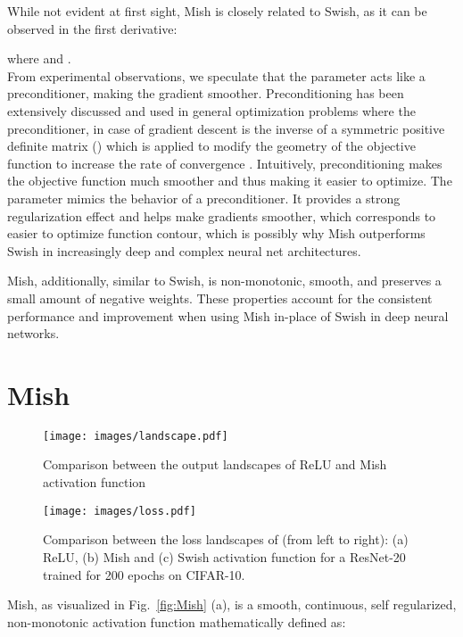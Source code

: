 \documentclass{bmvc2k}
\begin{document}
 
While not evident at first sight, Mish is closely related to Swish, as it can be observed in the first derivative:


where   and  . 
\\

From experimental observations, we speculate that the  parameter acts like a preconditioner, making the gradient smoother. Preconditioning has been extensively discussed and used in general optimization problems where the preconditioner, in case of gradient descent \cite{bottou2010large, li2017preconditioned} is the inverse of a symmetric positive definite matrix () which is applied to modify the geometry of the objective function to increase the rate of convergence \cite{axelsson1986rate}. Intuitively, preconditioning makes the objective function much smoother and thus making it easier to optimize. The  parameter mimics the behavior of a preconditioner. It provides a strong regularization effect and helps make gradients smoother, which corresponds to easier to optimize function contour, which is possibly why Mish outperforms Swish in increasingly deep and complex neural net architectures. 

Mish, additionally, similar to Swish, is non-monotonic, smooth, and preserves a small amount of negative weights. These properties account for the consistent performance and improvement when using Mish in-place of Swish in deep neural networks.

\section{Mish}
\label{sec:mish}

\begin{figure}
	\centering
	\texttt{[image: images/landscape.pdf]}
	\caption{Comparison between the output landscapes of ReLU and Mish activation function}
	\label{fig:landscape}
\end{figure}

\begin{figure}
	\centering
	\texttt{[image: images/loss.pdf]}
	\caption{Comparison between the loss landscapes of (from left to right): (a) ReLU, (b) Mish and (c) Swish activation function for a ResNet-20 trained for 200 epochs on CIFAR-10.}
	\label{fig:loss}
\end{figure}

Mish, as visualized in Fig.~\ref{fig:Mish} (a), is a smooth, continuous, self regularized, non-monotonic activation function mathematically defined as:
\end{document}
